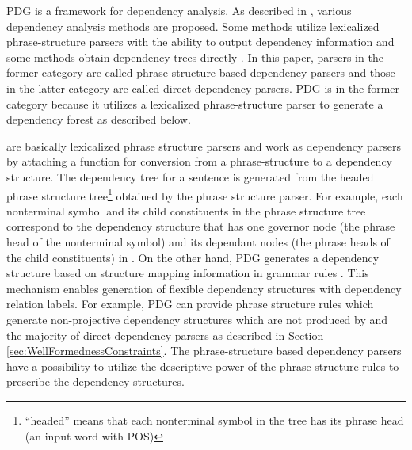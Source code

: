 PDG is a framework for dependency analysis. As described in
\cite{McDonald05}, various dependency analysis methods are
proposed. Some methods utilize lexicalized phrase-structure parsers
with the ability to output dependency information
\cite{Collins99,Charniak00} and some methods obtain dependency trees
directly \cite{Ozeki94,Kato_ehara89,Eisner96,YamadaAndMatsumoto03,NivreAndScholz04}.
In this paper, parsers in the former category are called
phrase-structure based dependency parsers and those in the latter
category are called direct dependency parsers. PDG is in the former
category because it utilizes a lexicalized phrase-structure parser to
generate a dependency forest \cite{Hirakawa05a} as described below.

\cite{Collins99,Charniak00} are basically lexicalized phrase structure
parsers and work as dependency parsers by attaching a function for
conversion from a phrase-structure to a dependency structure. The
dependency tree for a sentence is generated from the headed phrase
structure tree\footnote{``headed'' means that each nonterminal symbol in the tree
has its phrase head (an input word with POS)} obtained
by the phrase structure parser. For example, each nonterminal symbol
and its child constituents in the phrase structure tree correspond to
the dependency structure that has one governor node (the phrase head
of the nonterminal symbol) and its dependant nodes (the phrase heads
of the child constituents) in \cite{Collins99}. On the other hand, PDG
generates a dependency structure based on structure mapping information
in grammar rules \cite{Hirakawa05a}. This mechanism enables 
generation of flexible dependency structures with dependency relation
labels. For example, PDG can provide phrase structure rules which
generate non-projective dependency structures which are not produced
by \cite{Collins99,Charniak00} and the majority of direct dependency
parsers as described in Section \ref{sec:WellFormednessConstraints}. 
The phrase-structure based dependency parsers have a possibility to 
utilize the descriptive power of the phrase structure rules to
prescribe the dependency structures.

